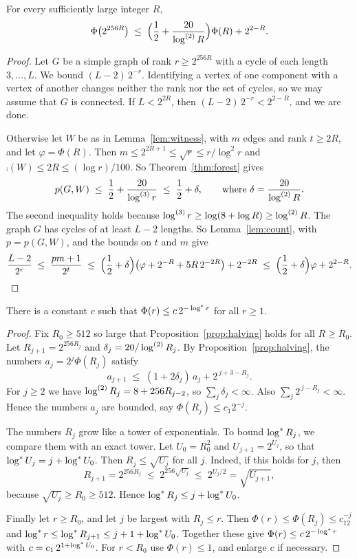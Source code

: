 \documentclass[11pt]{article}
\begin{document}
\begin{proposition}\label{prop:halving}
For every sufficiently large integer $R$,
\[
  \Phi\bigl(2^{256R}\bigr)\;\le\;\Bigl(\frac12+\frac{20}{\log^{(2)}R}\Bigr)\Phi(R)+2^{2-R}.
\]
\end{proposition}

\begin{proof}
Let $G$ be a simple graph of rank $r\ge2^{256R}$ with a cycle of each length $3,\dots,L$. We bound
$(L-2)\,2^{-r}$. Identifying a vertex of one component with a vertex of another changes neither the
rank nor the set of cycles, so we may assume that $G$ is connected. If $L<2^{2R}$, then
$(L-2)\,2^{-r}<2^{2-R}$, and we are done.

Otherwise let $W$ be as in Lemma~\ref{lem:witness}, with $m$ edges and rank $t\ge2R$, and let
$\varphi=\Phi(R)$. Then $m\le2^{2R+1}\le\sqrt r\le r/\log^{2}r$ and
$\comp(W)\le2R\le(\log r)/100$. So Theorem~\ref{thm:forest} gives
\[
  p(G,W)\;\le\;\frac12+\frac{20}{\log^{(3)}r}\;\le\;\frac12+\delta,
  \qquad\text{where }\delta=\frac{20}{\log^{(2)}R}.
\]
The second inequality holds because $\log^{(3)}r\ge\log(8+\log R)\ge\log^{(2)}R$. The graph $G$ has cycles of
at least $L-2$ lengths. So Lemma~\ref{lem:count}, with $p=p(G,W)$, and the bounds on $t$ and $m$
give
\[
  \frac{L-2}{2^{r}}\;\le\;\frac{pm+1}{2^{t}}
  \;\le\;\Bigl(\frac12+\delta\Bigr)\bigl(\varphi+2^{-R}+5R\,2^{-2R}\bigr)+2^{-2R}
  \;\le\;\Bigl(\frac12+\delta\Bigr)\varphi+2^{2-R}.\qedhere
\]
\end{proof}

\begin{corollary}\label{cor:phi}
There is a constant $c$ such that $\Phi(r)\le c\,2^{-\log^{*} r}$ for all $r\ge1$.
\end{corollary}

\begin{proof}
Fix $R_0\ge512$ so large that Proposition~\ref{prop:halving} holds for all $R\ge R_0$. Let
$R_{j+1}=2^{256R_j}$ and $\delta_j=20/\log^{(2)}R_j$. By Proposition~\ref{prop:halving}, the numbers
$a_j=2^{j}\Phi(R_j)$ satisfy
\[
  a_{j+1}\;\le\;(1+2\delta_j)\,a_j+2^{\,j+3-R_j}.
\]
For $j\ge2$ we have $\log^{(2)}R_j=8+256R_{j-2}$, so $\sum_j\delta_j<\infty$. Also
$\sum_j2^{\,j-R_j}<\infty$. Hence the numbers $a_j$ are bounded, say $\Phi(R_j)\le c_1 2^{-j}$.

The numbers $R_j$ grow like a tower of exponentials. To bound $\log^{*} R_j$, we compare them with an
exact tower. Let $U_0=R_0^2$ and $U_{j+1}=2^{U_j}$, so that $\log^{*} U_j=j+\log^{*} U_0$. Then
$R_j\le\sqrt{U_j}$ for all $j$. Indeed, if this holds for $j$, then
\[
  R_{j+1}=2^{256R_j}\;\le\;2^{256\sqrt{U_j}}\;\le\;2^{U_j/2}=\sqrt{U_{j+1}},
\]
because $\sqrt{U_j}\ge R_0\ge512$. Hence $\log^{*} R_j\le j+\log^{*} U_0$.

Finally let $r\ge R_0$, and let $j$ be largest with $R_j\le r$. Then
$\Phi(r)\le\Phi(R_j)\le c_12^{-j}$ and $\log^{*} r\le\log^{*} R_{j+1}\le j+1+\log^{*} U_0$. Together these give
$\Phi(r)\le c\,2^{-\log^{*} r}$ with $c=c_1\,2^{1+\log^{*} U_0}$. For $r<R_0$ use $\Phi(r)\le1$, and enlarge
$c$ if necessary.
\end{proof}
\end{document}

